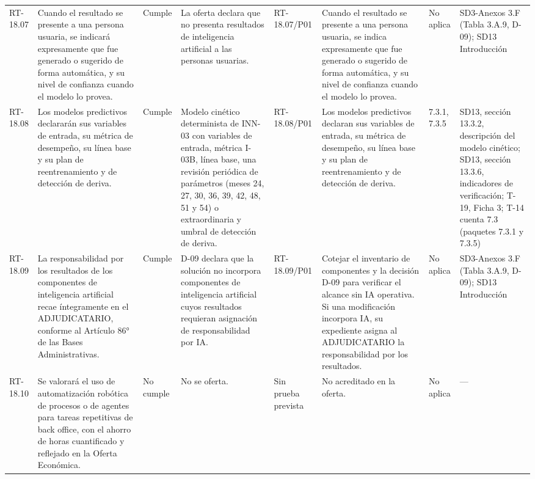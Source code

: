 \documentclass[oficio,firma,final]{lafrox}
\begin{document}
\begin{landscape}
{\begin{longtable}{@{}F{0.054} F{0.173} F{0.061} F{0.191} F{0.106} F{0.180} F{0.067} F{0.168}@{}}
  RT-18.07 & Cuando el resultado se presente a una persona usuaria, se indicará expresamente que fue generado o sugerido de forma automática, y su nivel de confianza cuando el modelo lo provea. & Cumple & La oferta declara que no presenta resultados de inteligencia artificial a las personas usuarias. & RT-18.07/\allowbreak{}P01 & Cuando el resultado se presente a una persona usuaria, se indica expresamente que fue generado o sugerido de forma automática, y su nivel de confianza cuando el modelo lo provea. & No aplica & SD3-Anexos 3.F (Tabla 3.A.9, D-09); SD13 Introducción  \\
  RT-18.08 & Los modelos predictivos declararán sus variables de entrada, su métrica de desempeño, su línea base y su plan de reentrenamiento y de detección de deriva. & Cumple & Modelo cinético determinista de INN-03 con variables de entrada, métrica I-03B, línea base, una revisión periódica de parámetros (meses 24, 27, 30, 36, 39, 42, 48, 51 y 54) o extraordinaria y umbral de detección de deriva. & RT-18.08/\allowbreak{}P01 & Los modelos predictivos declaran sus variables de entrada, su métrica de desempeño, su línea base y su plan de reentrenamiento y de detección de deriva. & 7.3.1, 7.3.5 & SD13, sección 13.3.2, descripción del modelo cinético; SD13, sección 13.3.6, indicadores de verificación; T-19, Ficha 3; T-14 cuenta 7.3 (paquetes 7.3.1 y 7.3.5)  \\
  RT-18.09 & La responsabilidad por los resultados de los componentes de inteligencia artificial recae íntegramente en el ADJUDICATARIO, conforme al Artículo 86° de las Bases Administrativas. & Cumple & D-09 declara que la solución no incorpora componentes de inteligencia artificial cuyos resultados requieran asignación de responsabilidad por IA. & RT-18.09/\allowbreak{}P01 & Cotejar el inventario de componentes y la decisión D-09 para verificar el alcance sin IA operativa. Si una modificación incorpora IA, su expediente asigna al ADJUDICATARIO la responsabilidad por los resultados. & No aplica & SD3-Anexos 3.F (Tabla 3.A.9, D-09); SD13 Introducción  \\
  RT-18.10 & Se valorará el uso de automatización robótica de procesos o de agentes para tareas repetitivas de back office, con el ahorro de horas cuantificado y reflejado en la Oferta Económica. & No cumple & No se oferta. & Sin prueba prevista & No acreditado en la oferta. & No aplica & —  \\

\end{longtable}}
\end{landscape}
\end{document}
